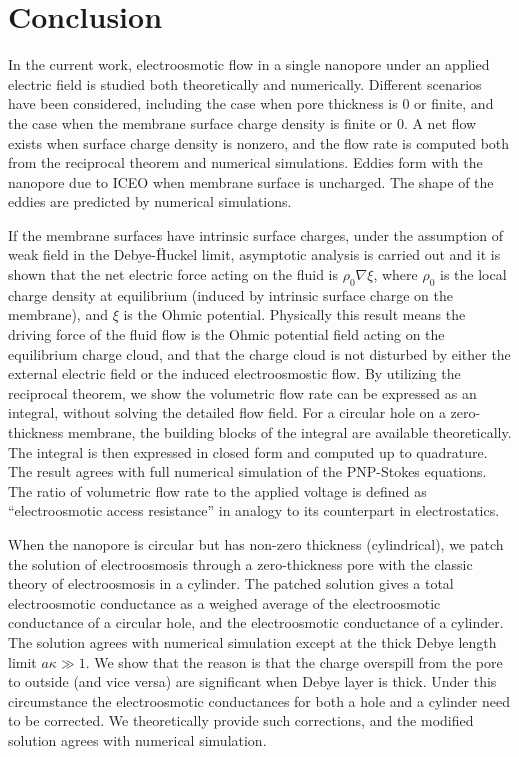 \chapter{Conclusion}
In the current work, electroosmotic flow in a single nanopore under an applied electric field is studied both theoretically and numerically. Different scenarios have been considered, including the case when pore thickness is 0 or finite, and the case when the membrane surface charge density is finite or 0. A net flow exists when surface charge density is nonzero, and the flow rate is computed both from the reciprocal theorem and numerical simulations. Eddies form with the nanopore due to ICEO when membrane surface is uncharged. The shape of the eddies are predicted by numerical simulations.

If the membrane surfaces have intrinsic surface charges, under the assumption of weak field in the Debye-H\"{}uckel limit, asymptotic analysis is carried out and it is shown that the net electric force acting on the fluid is $\rho_0\nabla\xi$, where $\rho_0$ is the local charge density at equilibrium (induced by intrinsic surface charge on the membrane), and $\xi$ is the Ohmic potential. Physically this result means the driving force of the fluid flow is the Ohmic potential field acting on the equilibrium charge cloud, and that the charge cloud is not disturbed by either the external electric field or the induced electroosmostic flow. By utilizing the reciprocal theorem, we show the volumetric flow rate can be expressed as an integral, without solving the detailed flow field. For a circular hole on a zero-thickness membrane, the building blocks of the integral are available theoretically. The integral is then expressed in closed form and computed up to quadrature. The result agrees with full numerical simulation of the PNP-Stokes equations. The ratio of volumetric flow rate to the applied voltage is defined as ``electroosmotic access resistance'' in analogy to its counterpart in electrostatics.

When the nanopore is circular but has non-zero thickness (cylindrical), we patch the solution of electroosmosis through a zero-thickness pore with the classic theory of electroosmosis in a cylinder. The patched solution gives a total electroosmotic conductance as a weighed average of the electroosmotic conductance of a circular hole, and the electroosmotic conductance of a cylinder. The solution agrees with numerical simulation except at the thick Debye length limit $a\kappa \gg 1$. We show that the reason is that the charge overspill from the pore to outside (and vice versa) are significant when Debye layer is thick. Under this circumstance the electroosmotic conductances for both a hole and a cylinder need to be corrected. We theoretically provide such corrections, and the modified solution agrees with numerical simulation.

